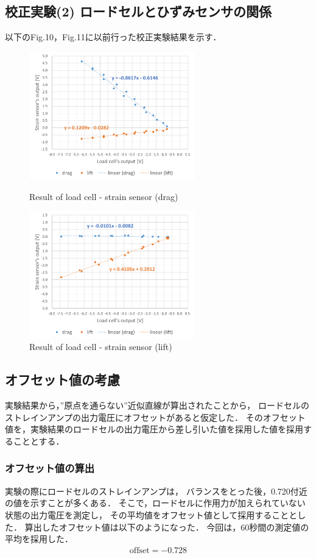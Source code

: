 \documentclass[twocolumn,a4j]{jsarticle}
\begin{document}
\subsection{校正実験(2) ロードセルとひずみセンサの関係}
以下のFig.10，Fig.11に以前行った校正実験結果を示す．
\begin{figure}[htbp]
    \footnotesize
    \begin{center}
        \includegraphics[width=72mm]{../images/calibration_2_drag.png}
        \caption{Result of load cell - strain sensor (drag)}
        \includegraphics[width=72mm]{../images/calibration_2_lift.png}
        \caption{Result of load cell - strain sensor (lift)}
    \end{center}
\end{figure}

\newpage
\subsection{オフセット値の考慮}
実験結果から，”原点を通らない”近似直線が算出されたことから，
ロードセルのストレインアンプの出力電圧にオフセットがあると仮定した．
そのオフセット値を，実験結果のロードセルの出力電圧から差し引いた値を採用した値を採用することとする．\\
\subsubsection{オフセット値の算出}
実験の際にロードセルのストレインアンプは，
バランスをとった後，0.720付近の値を示すことが多くある．
そこで，ロードセルに作用力が加えられていない状態の出力電圧を測定し，
その平均値をオフセット値として採用することとした．
算出したオフセット値は以下のようになった．
今回は，60秒間の測定値の平均を採用した．
\begin{eqnarray*}
  \mathrm{offset} = -0.728
\end{eqnarray*}
\end{document}
